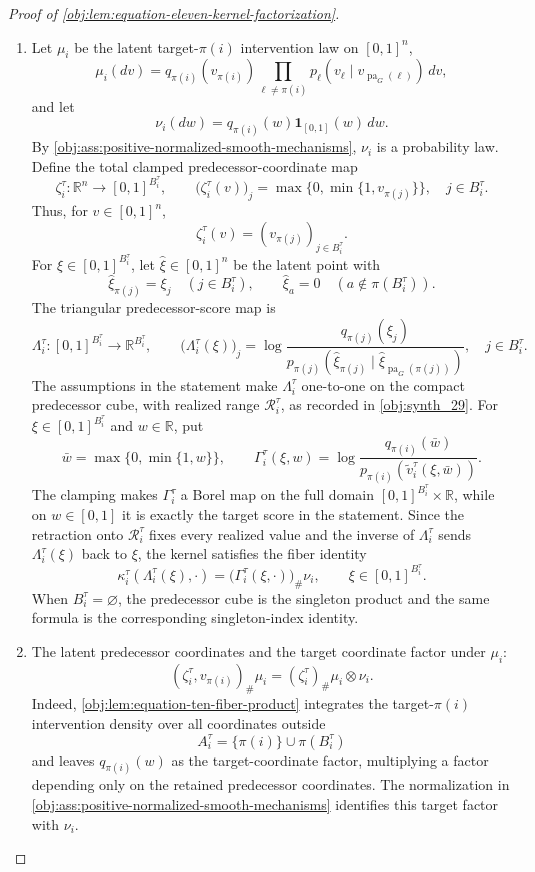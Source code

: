 \begin{proof}[Proof of \cref{obj:lem:equation-eleven-kernel-factorization}]
\begin{enumerate}
\item Let \(\mu_i\) be the latent target-\(\pi(i)\) intervention law on \([0,1]^n\),
\[
\mu_i(dv)
=
q_{\pi(i)}(v_{\pi(i)})
\prod_{\ell\ne \pi(i)}
p_\ell(v_\ell\mid v_{\operatorname{pa}_G(\ell)})\,dv,
\]
and let
\[
\nu_i(dw)=q_{\pi(i)}(w)\mathbf 1_{[0,1]}(w)\,dw .
\]
By \cref{obj:ass:positive-normalized-smooth-mechanisms}, \(\nu_i\) is a probability law. Define the total clamped predecessor-coordinate map
\[
\zeta_i^\tau:\mathbb R^n\longrightarrow [0,1]^{B_i^\tau},
\qquad
\bigl(\zeta_i^\tau(v)\bigr)_j
=
\max\{0,\min\{1,v_{\pi(j)}\}\},
\quad j\in B_i^\tau .
\]
Thus, for \(v\in[0,1]^n\),
\[
\zeta_i^\tau(v)=(v_{\pi(j)})_{j\in B_i^\tau}.
\]
For \(\xi\in[0,1]^{B_i^\tau}\), let \(\widehat \xi\in[0,1]^n\) be the latent point with
\[
\widehat \xi_{\pi(j)}=\xi_j\quad (j\in B_i^\tau),
\qquad
\widehat \xi_a=0\quad (a\notin \pi(B_i^\tau)).
\]
The triangular predecessor-score map is
\[
\Lambda_i^\tau:[0,1]^{B_i^\tau}\to\mathbb R^{B_i^\tau},
\qquad
\bigl(\Lambda_i^\tau(\xi)\bigr)_j
=
\log
\frac{q_{\pi(j)}(\xi_j)}
{p_{\pi(j)}\!\left(\widehat \xi_{\pi(j)}\mid
\widehat \xi_{\operatorname{pa}_G(\pi(j))}\right)},
\quad j\in B_i^\tau .
\]
The assumptions in the statement make \(\Lambda_i^\tau\) one-to-one on the compact predecessor cube, with realized range \(\mathcal R_i^\tau\), as recorded in \cref{obj:synth_29}. For \(\xi\in[0,1]^{B_i^\tau}\) and \(w\in\mathbb R\), put
\[
\bar w=\max\{0,\min\{1,w\}\},
\qquad
\Gamma_i^\tau(\xi,w)
=
\log
\frac{q_{\pi(i)}(\bar w)}
{p_{\pi(i)}\!\left(\widetilde v_i^\tau(\xi,\bar w)\right)} .
\]
The clamping makes \(\Gamma_i^\tau\) a Borel map on the full domain
\([0,1]^{B_i^\tau}\times\mathbb R\), while on \(w\in[0,1]\) it is exactly the target score in the statement. Since the retraction onto \(\mathcal R_i^\tau\) fixes every realized value and the inverse of \(\Lambda_i^\tau\) sends \(\Lambda_i^\tau(\xi)\) back to \(\xi\), the kernel satisfies the fiber identity
\[
\kappa_i^\tau(\Lambda_i^\tau(\xi),\cdot)
=
\bigl(\Gamma_i^\tau(\xi,\cdot)\bigr)_{\#}\nu_i,
\qquad
\xi\in[0,1]^{B_i^\tau}.
\]
When \(B_i^\tau=\varnothing\), the predecessor cube is the singleton product and the same formula is the corresponding singleton-index identity. %

\item The latent predecessor coordinates and the target coordinate factor under \(\mu_i\):
\[
(\zeta_i^\tau,v_{\pi(i)})_{\#}\mu_i
=
(\zeta_i^\tau)_{\#}\mu_i\otimes \nu_i .
\]
Indeed, \cref{obj:lem:equation-ten-fiber-product} integrates the target-\(\pi(i)\) intervention density over all coordinates outside
\[
A_i^\tau=\{\pi(i)\}\cup \pi(B_i^\tau)
\]
and leaves \(q_{\pi(i)}(w)\) as the target-coordinate factor, multiplying a factor depending only on the retained predecessor coordinates. The normalization in \cref{obj:ass:positive-normalized-smooth-mechanisms} identifies this target factor with \(\nu_i\). %


\end{enumerate}
\end{proof}
